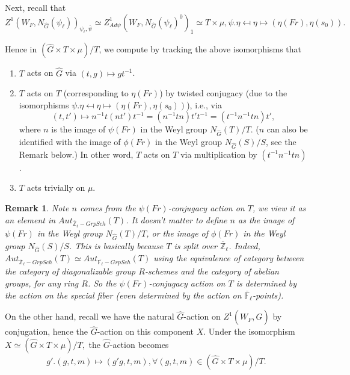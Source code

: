 \documentclass{article}
\newcommand{\red}[1]{\textcolor{red}{#1}}
\newtheorem*{remark}{Remark}
\begin{document}
	Next, recall that 
	$$Z^1(W_F, N_{\hat{G}}(\psi_{\ell}))_{\psi_{\ell}, \overline{\psi}} \simeq Z^1_{Ad\psi}(W_F, N_{\hat{G}}(\psi_{\ell})^0)_1 \simeq T \times \mu, \psi.\eta \mapsfrom \eta \mapsto (\eta(Fr), \eta(s_0)).$$
	
	Hence in $(\hat{G} \times T \times \mu)/T$, we compute by tracking the above isomorphisms that
	\begin{enumerate}
		\item $T$ acts on $\hat{G}$ via $(t, g) \mapsto gt^{-1}$.
		\item $T$ acts on $T$ (corresponding to $\eta(Fr)$) by twisted conjugacy (due to the isomorphisms $\psi.\eta \mapsfrom \eta \mapsto (\eta(Fr), \eta(s_0))$), i.e., via 
		$$(t, t') \mapsto n^{-1}t(nt')t^{-1}=(n^{-1}tn)t't^{-1}=(t^{-1}n^{-1}tn)t',$$
		where $n$ is the image of $\psi(Fr)$ 
		in the Weyl group $N_{\hat{G}}(T)/T$. ($n$ can also be identified with the image of $\phi(Fr)$ in the Weyl group $N_{\hat{G}}(S)/S$, see the Remark below.)
		In other word, $T$ acts on $T$ via multiplication by $(t^{-1}n^{-1}tn)$.
		\item $T$ acts trivially on $\mu$.
	\end{enumerate}
	
	\begin{remark}
		
		Note $n$ comes from the $\psi(Fr)$-conjugacy action on $T$, we view it as an element in $Aut_{\overline{\mathbb{Z}}_{\ell}-Grp Sch}(T)$. It doesn't matter to define $n$ as the image of $\psi(Fr)$ in the Weyl group $N_{\hat{G}}(T)/T$, or the image of $\phi(Fr)$ in the Weyl group $N_{\hat{G}}(S)/S$. This is basically because $T$ is split over $\overline{\mathbb{Z}}_{\ell}$. Indeed, $Aut_{\overline{\mathbb{Z}}_{\ell}-Grp Sch}(T) \simeq Aut_{\overline{\mathbb{F}_{\ell}}-Grp Sch}(T)$ using the equivalence of category between the category of diagonalizable group $R$-schemes and the category of abelian groups, for any ring $R$. So the $\psi(Fr)$-conjugacy action on $T$ is determined by the action on the special fiber (even determined by the action on $\overline{\mathbb{F}}_{\ell}$-points).
	\end{remark}
	
	On the other hand, recall we have the natural $\hat{G}$-action on $Z^1(W_F, \hat{G})$ by conjugation, hence the $\hat{G}$-action on this component $X$. Under the isomorphism 
	$X \simeq (\hat{G} \times T \times \mu)/T,$ the $\hat{G}$-action becomes
	$$g'.(g, t, m) \mapsto (g'g, t, m), \forall (g, t, m) \in (\hat{G} \times T \times \mu)/T.$$
	
\end{document}
